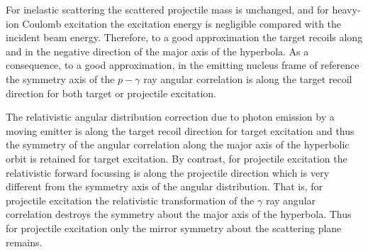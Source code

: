 \documentclass[10pt]{article}
\begin{document}
For inelastic scattering the scattered projectile mass is unchanged, and for heavy-ion Coulomb excitation the excitation energy is negligible compared with the incident beam energy. Therefore, to a good approximation the target recoils along and in the negative direction of the major axis of the hyperbola. As a consequence, to a good approximation, in the emitting nucleus frame of reference the symmetry axis of the $p-\gamma$ ray angular correlation is along the target recoil direction for both target or projectile excitation.

The relativistic angular distribution correction due to photon emission by a moving emitter is along the target recoil direction for target excitation and thus the symmetry of the angular correlation along the major axis of the hyperbolic orbit is retained for target excitation. By contrast, for projectile excitation the relativistic forward focussing is along the projectile direction which is very different from the symmetry axis of the angular distribution. That is, for projectile excitation the relativistic transformation of the $\gamma$ ray angular correlation destroys the symmetry about the major axis of the hyperbola. Thus for projectile excitation only the mirror symmetry about the scattering plane remains.
\end{document}

